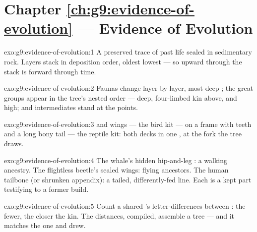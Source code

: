 \section*{Chapter \ref{ch:g9:evidence-of-evolution} --- Evidence of Evolution}

\begin{solution}{exo:g9:evidence-of-evolution:1}
A preserved trace of past life sealed in sedimentary rock.
Layers stack in deposition order, oldest lowest --- so
upward through the stack is forward through time.
\end{solution}

\begin{solution}{exo:g9:evidence-of-evolution:2}
Faunas change layer by layer, most deep  ;
the great groups appear in the tree's nested order ---
 deep, four-limbed kin above,  and  high;
and intermediates stand at the  points.
\end{solution}

\begin{solution}{exo:g9:evidence-of-evolution:3}
 and wings --- the bird kit --- on a frame with
teeth and a long bony tail --- the reptile kit: both decks
in one , at the fork the tree draws.
\end{solution}

\begin{solution}{exo:g9:evidence-of-evolution:4}
The whale's hidden hip-and-leg : a walking ancestry.
The flightless beetle's sealed wings: flying ancestors.
The human tailbone (or shrunken appendix): a tailed,
differently-fed line. Each is a kept part testifying to a
former build.
\end{solution}

\begin{solution}{exo:g9:evidence-of-evolution:5}
Count a shared 's letter-differences between :
the fewer, the closer the kin. The distances, compiled,
assemble a tree --- and it matches the one  and
 drew.
\end{solution}

